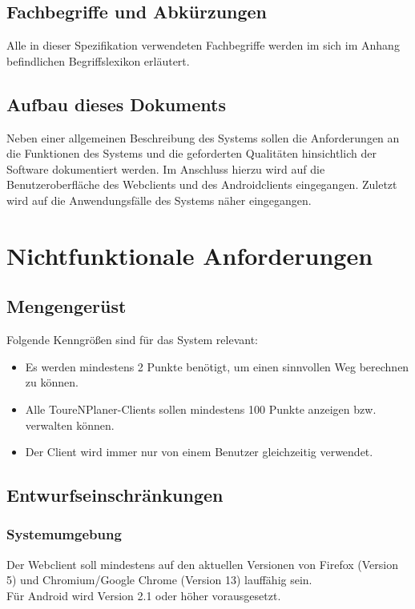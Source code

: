 \documentclass[a4paper,10pt,titlepage]{article}
\begin{document}
\subsection{Fachbegriffe und Abkürzungen}

Alle in dieser Spezifikation verwendeten Fachbegriffe werden im sich im Anhang befindlichen Begriffslexikon erläutert.

\subsection{Aufbau dieses Dokuments}

Neben einer allgemeinen Beschreibung des Systems sollen die Anforderungen an die Funktionen des Systems und die geforderten Qualitäten hinsichtlich der Software dokumentiert werden. 
Im Anschluss hierzu wird auf die Benutzeroberfläche des Webclients und des Androidclients eingegangen. 
Zuletzt wird auf die Anwendungsfälle des Systems näher eingegangen. 

\section{Nichtfunktionale Anforderungen}

\subsection{Mengengerüst} \label{Mengengeruest}

Folgende Kenngrößen sind für das System relevant:
\begin{itemize}
\item Es werden mindestens 2 Punkte benötigt, um einen sinnvollen Weg berechnen zu können.
\item Alle ToureNPlaner-Clients sollen mindestens 100 Punkte anzeigen bzw. verwalten können.
\item Der Client wird immer nur von einem Benutzer gleichzeitig verwendet.
\end{itemize}

\subsection{Entwurfseinschränkungen}

\subsubsection{Systemumgebung} \label{sysumgebung}
Der Webclient soll mindestens auf den aktuellen Versionen von Firefox (Version 5) und Chromium/Google Chrome (Version 13) lauffähig sein.\\
Für Android wird Version 2.1 oder höher vorausgesetzt.
\end{document}
